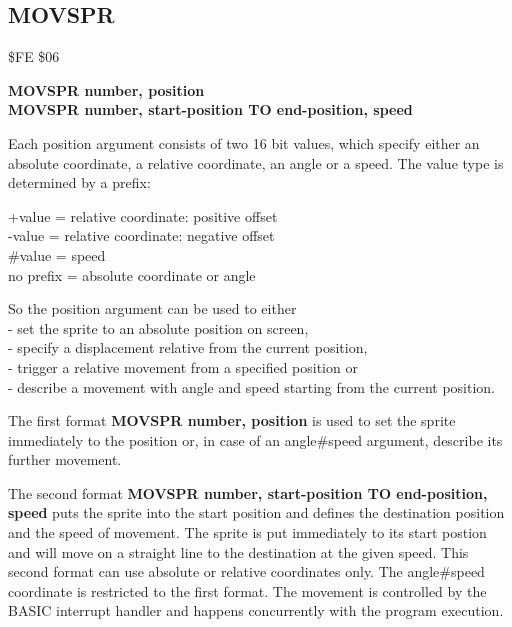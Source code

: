 \subsection{MOVSPR}
\begin{description}[leftmargin=2cm,style=nextline]
\item [Token:] \$FE \$06
\item [Format:] {\bf MOVSPR number, position} \\
                {\bf MOVSPR number, start-position TO end-position, speed}
\item [Usage:]  Each position argument consists of two 16 bit values,
                which specify either an absolute coordinate, a relative coordinate,
                an angle or a speed. The value type is determined by a prefix:

                +value = relative coordinate: positive offset \\
                -value = relative coordinate: negative offset \\
                \#value = speed \\
                no prefix = absolute coordinate or angle

  So the position argument can be used to either \\
- set the sprite to an absolute position on screen, \\
- specify a displacement relative from the current position, \\
- trigger a relative movement from a specified position or \\
- describe a movement with angle and speed starting from the current position.

                The first format {\bf MOVSPR number, position} is used to
                set the sprite immediately to the position or, in case of
                an angle\#speed argument, describe its further movement.

                The second format
                {\bf MOVSPR number, start-position TO end-position, speed}
                puts the sprite into the start position and defines the
                destination position and the speed of movement.
                The sprite is put immediately to its start postion and will move
                on a straight line to the destination at the given speed.
                This second format can use absolute or relative coordinates only.
                The angle\#speed coordinate is restricted to the first format.
                The movement is controlled by the BASIC interrupt handler and
                happens concurrently with the program execution.



\end{description}
